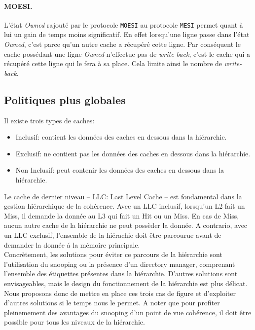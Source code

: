 \paragraph{MOESI.} L'état \emph{Owned} rajouté par le protocole \texttt{MOESI} au protocole \texttt{MESI} permet quant à lui un gain de temps moins significatif. En effet lorsqu'une ligne passe dans l'état \emph{Owned}, c'est parce qu'un autre cache a récupéré cette ligne. Par conséquent le cache possédant une ligne \emph{Owned} n'effectue pas de \emph{write-back}, c'est le cache qui a récupéré cette ligne qui le fera à sa place. Cela limite ainsi le nombre de \emph{write-back}.

\subsection{Politiques plus globales}
\label{global}

\indent Il existe trois types de caches: \\
\begin{itemize}
\item Inclusif: contient les donn\'ees des caches en dessous dans la hi\'erarchie.
\item Exclusif: ne contient pas les donn\'ees des caches en dessous dans la hi\'erarchie.
\item Non Inclusif: peut contenir les donn\'ees des caches en dessous dans la hi\'erarchie. \\
\end{itemize}

\indent Le cache de dernier niveau -- LLC: Last Level Cache -- est fondamental dans la gestion hi\'erarchique de la coh\'erence. Avec un LLC inclusif, lorsqu'un L2 fait un Miss, il demande la donn\'ee au L3 qui fait un Hit ou un Miss. En cas de Miss, aucun autre cache de la hi\'erarchie ne peut poss\`eder la donn\'ee. A contrario, avec un LLC exclusif, l'ensemble de la hi\'erachie doit \^etre parcourue avant de demander la donn\'ee \'a la m\'emoire principale. \\

\indent Concr\`etement, les solutions pour \'eviter ce parcours de la hi\'erarchie sont l'utilisation du snooping ou la pr\'esence d'un directory manager, comprenant l'ensemble des \'etiquettes pr\'esentes dans la hi\'erarchie. D'autres solutions sont envisageables, mais le design du fonctionnement de la hi\'erarchie est plus d\'elicat. Nous proposons donc de mettre en place ces trois cas de figure et d'exploiter d'autres solutions si le temps nous le permet. A noter que pour profiter pleinemement des avantages du snooping d'un point de vue coh\'erence, il doit \^etre possible pour tous les niveaux de la hi\'erarchie.
